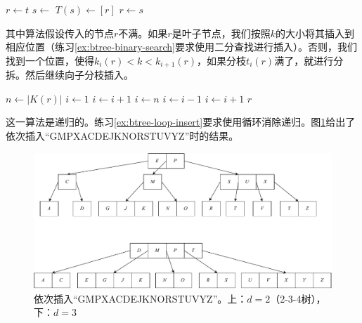 \documentclass[b5paper]{ctexart}
\begin{document}
\begin{algorithmic}[1]
  \State $r \gets t$
   
    \State $s \gets$ 
    \State $T(s) \gets [ r ]$
    \State {}
    \State $r \gets s$
  \EndIf
  \State \Return {}
\EndFunction
\end{algorithmic}

其中算法假设传入的节点$r$不满。如果$r$是叶子节点，我们按照$k$的大小将其插入到相应位置（练习\ref{ex:btree-binary-search}要求使用二分查找进行插入）。否则，我们找到一个位置，使得$k_i(r) < k < k_{i+1}(r)$，如果分枝$t_i(r)$满了，就进行分拆。然后继续向子分枝插入。

\begin{algorithmic}[1]
  \State $n \gets |K(r)|$
    \State $i \gets 1$
      \State $i \gets i + 1$
    \EndWhile
    \State {}
  \Else
    \State $i \gets n$
      \State $i \gets i - 1$
    \EndWhile
      \State {}
        \State $i \gets i + 1$
      \EndIf
    \EndIf
    \State {}
  \EndIf
  \State \Return $r$
\EndFunction
\end{algorithmic}

这一算法是递归的。练习\ref{ex:btree-loop-insert}要求使用循环消除递归。图\ref{fig:btree-insert}给出了依次插入``GMPXACDEJKNORSTUVYZ''时的结果。

\begin{figure}[htbp]
  \centering
  \includegraphics[scale=0.5]{img/btree-split-insert-example}
  \caption{依次插入``GMPXACDEJKNORSTUVYZ''。上：$d = 2$（2-3-4树），下：$d = 3$}
  \label{fig:btree-insert}
\end{figure}
\end{document}
